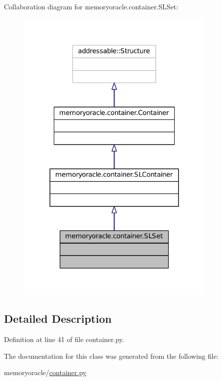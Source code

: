 Collaboration diagram for memoryoracle.\+container.\+S\+L\+Set\+:\nopagebreak
\begin{figure}[H]
\begin{center}
\leavevmode
\includegraphics[width=275pt]{classmemoryoracle_1_1container_1_1SLSet__coll__graph}
\end{center}
\end{figure}


\subsection{Detailed Description}


Definition at line 41 of file container.\+py.



The documentation for this class was generated from the following file\+:\begin{DoxyCompactItemize}
\item 
memoryoracle/\hyperlink{container_8py}{container.\+py}\end{DoxyCompactItemize}
